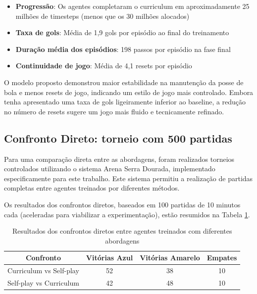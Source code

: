 \begin{itemize}
    \item \textbf{Progressão}: Os agentes completaram o curriculum em aproximadamente 25 milhões de timesteps (menos que os 30 milhões alocados)
    \item \textbf{Taxa de gols}: Média de 1,9 gols por episódio ao final do treinamento
    \item \textbf{Duração média dos episódios}: 198 passos por episódio na fase final
    \item \textbf{Continuidade de jogo}: Média de 4,1 resets por episódio
\end{itemize}

O modelo proposto demonstrou maior estabilidade na manutenção da posse de bola e menos resets de jogo, indicando um estilo de jogo mais controlado. Embora tenha apresentado uma taxa de gols ligeiramente inferior ao baseline, a redução no número de resets sugere um jogo mais fluido e tecnicamente refinado.

\subsection{Confronto Direto: torneio com 500 partidas}

Para uma comparação direta entre as abordagens, foram realizados torneios controlados utilizando o sistema Arena Serra Dourada, implementado especificamente para este trabalho. Este sistema permitiu a realização de partidas completas entre agentes treinados por diferentes métodos.

Os resultados dos confrontos diretos, baseados em 100 partidas de 10 minutos cada (aceleradas para viabilizar a experimentação), estão resumidos na Tabela \ref{tab:confrontos_diretos}.

\begin{table}[H]
    \centering
    \begin{tabular}{|c|c|c|c|}
        \hline
        \textbf{Confronto} & \textbf{Vitórias Azul} & \textbf{Vitórias Amarelo} & \textbf{Empates} \\
        \hline
        Curriculum vs Self-play & 52 & 38 & 10 \\
        Self-play vs Curriculum & 42 & 48 & 10 \\
        \hline
    \end{tabular}
    \caption{Resultados dos confrontos diretos entre agentes treinados com diferentes abordagens}
    \label{tab:confrontos_diretos}
\end{table}

